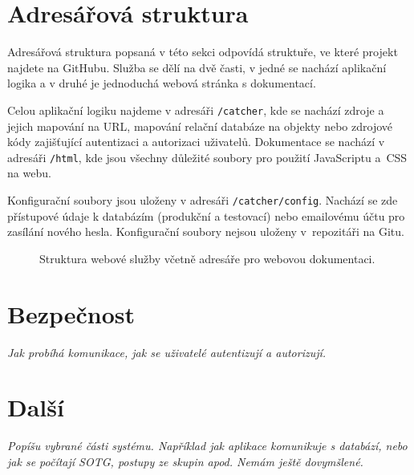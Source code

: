 
\section{Adresářová struktura}


\indent

Adresářová struktura popsaná v této sekci odpovídá struktuře, ve které projekt najdete na GitHubu.
Služba se dělí na dvě časti, v jedné se nachází aplikační logika a v druhé je jednoduchá webová stránka s dokumentací.

\medskip

Celou aplikační logiku najdeme v adresáři \texttt{/catcher}, kde se nachází zdroje a jejich mapování na URL,
mapování relační databáze na objekty nebo zdrojové kódy zajišťující autentizaci a autorizaci uživatelů.
Dokumentace se nachází v adresáři \texttt{/html}, kde jsou všechny důležité soubory pro použití JavaScriptu a~CSS na webu.

\medskip

Konfigurační soubory jsou uloženy v adresáři \texttt{/catcher/config}.
Nachází se zde přístupové údaje k databázím (produkční a testovací) nebo emailovému účtu pro zasílání nového hesla.
Konfigurační soubory nejsou uloženy v~repozitáři na Gitu. 

\begin{figure}[ht!]
\caption{Struktura webové služby včetně adresáře pro webovou dokumentaci.\label{overflow}}
\end{figure}

\section{Bezpečnost}

\textit{Jak probíhá komunikace, jak se uživatelé autentizují a autorizují.}

\section{Další}

\textit{Popíšu vybrané části systému. Například jak aplikace komunikuje s databází, nebo jak se počítají SOTG, postupy ze skupin apod. Nemám ještě dovymšlené.}